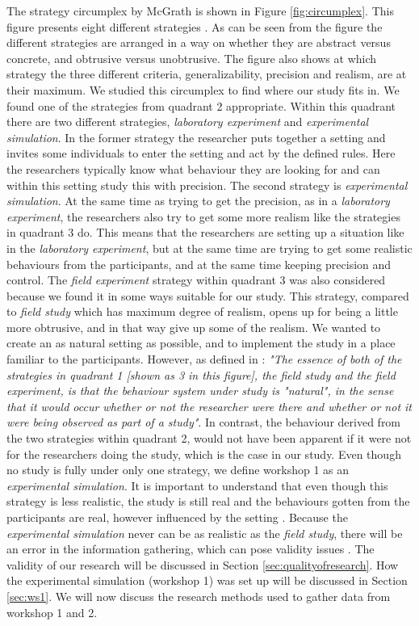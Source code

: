 The strategy circumplex by McGrath is shown in Figure \ref{fig:circumplex}. This figure presents eight different strategies \cite{McGrath}. As can be seen from the figure the different strategies are arranged in a way on whether they are abstract versus concrete, and obtrusive versus unobtrusive. The figure also shows at which strategy the three different criteria, generalizability, precision and realism, are at their maximum. We studied this circumplex to find where our study fits in. We found one of the strategies from quadrant 2 appropriate. Within this quadrant there are two different strategies, \emph{laboratory experiment} and \emph{experimental simulation}. In the former strategy the researcher puts together a setting and invites some individuals to enter the setting and act by the defined rules. Here the researchers typically know what behaviour they are looking for and can within this setting study this with precision. The second strategy is \emph{experimental simulation}. At the same time as trying to get the precision, as in a \emph{laboratory experiment}, the researchers also try to get some more realism like the strategies in quadrant 3 do. This means that the researchers are setting up a situation like in the \emph{laboratory experiment}, but at the same time are trying to get some realistic behaviours from the participants, and at the same time keeping precision and control. The \emph{field experiment} strategy within quadrant 3 was also considered because we found it in some ways suitable for our study. This strategy, compared to \emph{field study} which has maximum degree of realism, opens up for being a little more obtrusive, and in that way give up some of the realism. We wanted to create an as natural setting as possible, and to implement the study in a place familiar to the participants. However, as defined in \cite{McGrath}: \emph{"The essence of both of the strategies in quadrant 1 [shown as 3 in this figure], the field study and the field experiment, is that the behaviour system under study is "natural", in the sense that it would occur whether or not the researcher were there and whether or not it were being observed as part of a study"}. In contrast, the behaviour derived from the two strategies within quadrant 2, would not have been apparent if it were not for the researchers doing the study, which is the case in our study. Even though no study is fully under only one strategy, we define workshop 1 as an \emph{experimental simulation}. It is important to understand that even though this strategy is less realistic, the study is still real and the behaviours gotten from the participants are real, however influenced by the setting \cite{McGrath}. Because the \emph{experimental simulation} never can be as realistic as the \emph{field study}, there will be an error in the information gathering, which can pose validity issues \cite{alsos}. The validity of our research will be discussed in Section \ref{sec:qualityofresearch}. How the experimental simulation (workshop 1) was set up will be discussed in Section \ref{sec:ws1}. We will now discuss the research methods used to gather data from workshop 1 and 2.


